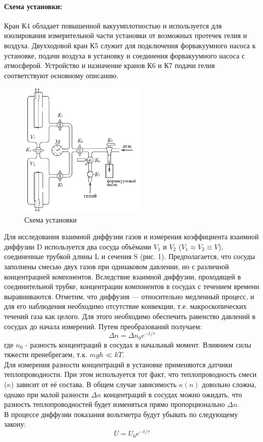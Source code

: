 \documentclass[a4paper]{article}
\begin{document}
	 \paragraph{Схема установки:} 	 
	 Кран К4 обладает повышенной вакуумплотностью и используется для изолирования измерительной части установки от возможных протечек гелия и воздуха. Двухходовой кран К5 служит для подключения форвакуумного насоса к установке, подачи воздуха в установку и соединения форвакуумного насоса с атмосферой. Устройство и назначение кранов К6 и К7 подачи гелия соответствуют основному описанию.\\
	 \begin{figure}[h!]
		\centering
		\includegraphics[height=65mm]{pic1.png}
		\caption{Схема установки\label{overflow}}
	 \end{figure}
	   Для исследования взаимной диффузии газов и измерения коэффициента взаимной диффузии D используется  два сосуда  объёмами $V_1$ и $V_2$ ($V_1 \approx V_2 \equiv V$), соединенные трубкой длины L и сечения S (рис. 1). Предполагается, что сосуды заполнены смесью двух газов при одинаковом давлении, но с различной концентрацией компонентов. Вследствие взаимной   диффузии,   проходящей в соединительной трубке, концентрации компонентов в сосудах с течением времени выравниваются. Отметим, что диффузия — относительно медленный процесс, и для его наблюдения необходимо отсутствие конвекции, т.е. макроскопических течений газа как целого. Для этого необходимо обеспечить равенство давлений в сосудах до начала измерений.
	   Путем преобразований получаем:
	 \begin{equation}
	   \Delta n = \Delta n_0 e^{-t/\tau}
	 \end{equation}
	   где $n_0$ - разность концентраций в сосудах в начальный момент.
	   Влиянием силы тяжести пренебрегаем, т.к. $mgh \ll kT$.\\
	   Для измерения разности  концентраций  в установке применяются датчики теплопроводности. При этом используется тот факт, что теплопроводность смеси ($\kappa$) зависит от её состава. В общем случае зависимость $\kappa(n)$ довольно сложна, однако при малой разности  $\Delta n$ концентраций в сосудах можно ожидать, что разность теплопроводностей будет изменяться прямо пропорционально $\Delta n$. \\
	   В процессе диффузии показания вольтметра будут убывать по следующему закону:
	 \begin{equation}
	   U=U_0 e^{-t/\tau}
	 \end{equation}
\end{document}
